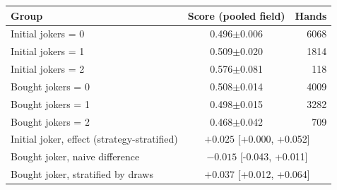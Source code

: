 \begin{tabular}{@{}lcr@{}}\toprule
Group & Score (pooled field) & Hands\\\midrule
Initial jokers = 0 & 0.496$\pm$0.006 & 6068 \\
Initial jokers = 1 & 0.509$\pm$0.020 & 1814 \\
Initial jokers = 2 & 0.576$\pm$0.081 & 118 \\
\midrule
Bought jokers = 0 & 0.508$\pm$0.014 & 4009 \\
Bought jokers = 1 & 0.498$\pm$0.015 & 3282 \\
Bought jokers = 2 & 0.468$\pm$0.042 & 709 \\
\midrule
Initial joker, effect (strategy-stratified) & \multicolumn{2}{c}{$+0.025$ [+0.000, +0.052]} \\
Bought joker, naive difference & \multicolumn{2}{c}{$-0.015$ [-0.043, +0.011]} \\
Bought joker, stratified by draws & \multicolumn{2}{c}{$+0.037$ [+0.012, +0.064]} \\
\bottomrule
\end{tabular}
